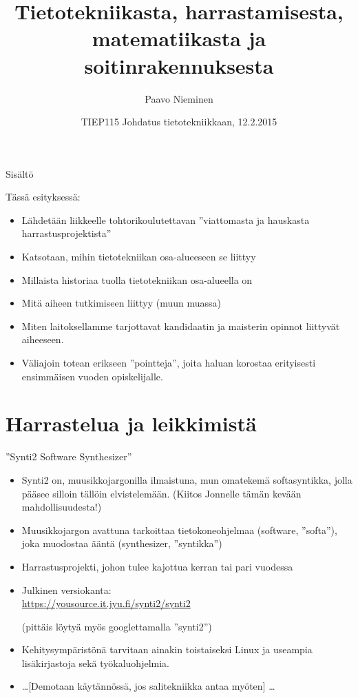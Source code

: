 \documentclass[pdf,handout,10pt]{beamer}
\title[TIEP115]
{Tietotekniikasta, harrastamisesta, matematiikasta ja soitinrakennuksesta}
\author{Paavo Nieminen}
\date{TIEP115 Johdatus tietotekniikkaan, 12.2.2015}
\begin{document}
\begin{frame}
  \titlepage
\end{frame}

\begin{frame}{Sisältö}

{
\setlength{\parskip}{\smallskipamount}
  \tableofcontents
}
\end{frame}
\beamerdefaultoverlayspecification{<+->}

\begin{frame}{Tässä esityksessä:}
  \begin{itemize}
  \item Lähdetään liikkeelle tohtorikoulutettavan ''viattomasta ja
    hauskasta harrastusprojektista''
  \item Katsotaan, mihin tietotekniikan osa-alueeseen se liittyy
  \item Millaista historiaa tuolla tietotekniikan osa-alueella on
  \item Mitä aiheen tutkimiseen liittyy (muun muassa)
  \item Miten laitoksellamme tarjottavat kandidaatin ja maisterin
    opinnot liittyvät aiheeseen.
  \item Väliajoin totean erikseen ''pointteja'', joita haluan korostaa
    erityisesti ensimmäisen vuoden opiskelijalle.
  \end{itemize}
\end{frame}


\section{Harrastelua ja leikkimistä}
\begin{frame}{''Synti2 Software Synthesizer''}
\begin{itemize}
  \item Synti2 on, muusikkojargonilla ilmaistuna, mun omatekemä
    softasyntikka, jolla pääsee silloin tällöin elvistelemään. (Kiitos
    Jonnelle tämän kevään mahdollisuudesta!)
  \item Muusikkojargon avattuna tarkoittaa tietokoneohjelmaa
    (software, ''softa''), joka muodostaa ääntä (synthesizer,
    ''syntikka'')
  \item Harrastusprojekti, johon tulee kajottua kerran tai pari vuodessa
  \item Julkinen versiokanta:\\ \small{\url{https://yousource.it.jyu.fi/synti2/synti2}}

    (pittäis löytyä myös googlettamalla ''synti2'')

  \item Kehitysympäristönä tarvitaan ainakin toistaiseksi Linux ja
    useampia lisäkirjastoja sekä työkaluohjelmia.
    
  \item \ldots [Demotaan käytännössä, jos salitekniikka antaa myöten]
    \ldots

\end{itemize}
\end{frame}
\end{document}
